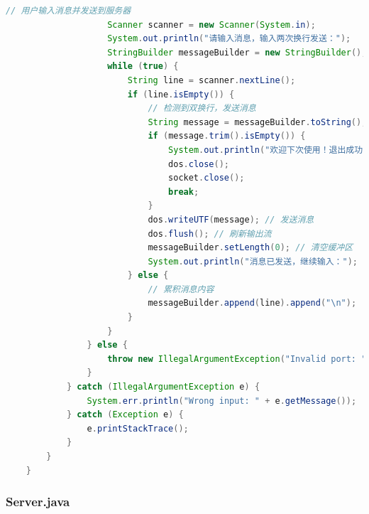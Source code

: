 \documentclass{article}
\begin{document}
\begin{lstlisting}[language=Java, title=Client.java, tabsize=4]
            		// 用户输入消息并发送到服务器
            		Scanner scanner = new Scanner(System.in);
            		System.out.println("请输入消息，输入两次换行发送：");
            		StringBuilder messageBuilder = new StringBuilder();
            		while (true) {
            			String line = scanner.nextLine();
            			if (line.isEmpty()) {
            				// 检测到双换行，发送消息
            				String message = messageBuilder.toString();
            				if (message.trim().isEmpty()) {
            					System.out.println("欢迎下次使用！退出成功");
            					dos.close();
            					socket.close();
            					break;
            				}
            				dos.writeUTF(message); // 发送消息
            				dos.flush(); // 刷新输出流
            				messageBuilder.setLength(0); // 清空缓冲区
            				System.out.println("消息已发送，继续输入：");
            			} else {
            				// 累积消息内容
            				messageBuilder.append(line).append("\n");
            			}
            		}
            	} else {
            		throw new IllegalArgumentException("Invalid port: " + port_);
            	}
            } catch (IllegalArgumentException e) {
            	System.err.println("Wrong input: " + e.getMessage());
            } catch (Exception e) {
            	e.printStackTrace();
            }
    	}
    }
	\end{lstlisting}
	
	\subsubsection{Server.java}
	
\end{document}
